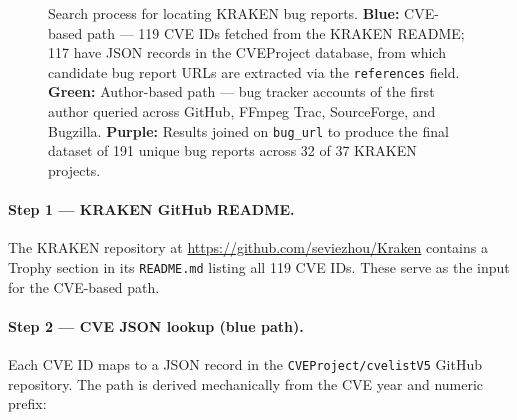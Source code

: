 \documentclass[11pt,a4paper]{article}
\begin{document}
\begin{figure}[htbp]
\caption{Search process for locating KRAKEN bug reports.
  \textcolor{blue!55!black}{\textbf{Blue:}} CVE-based path --- 119 CVE IDs fetched from
  the KRAKEN README; 117 have JSON records in the CVEProject database, from which
  candidate bug report URLs are extracted via the \texttt{references} field.
  \textcolor{green!45!black}{\textbf{Green:}} Author-based path --- bug tracker accounts
  of the first author queried across GitHub, FFmpeg Trac, SourceForge, and Bugzilla.
  \textcolor{purple!60!black}{\textbf{Purple:}} Results joined on \texttt{bug\_url} to
  produce the final dataset of 191 unique bug reports across 32 of 37 KRAKEN projects.}
\label{fig:flowchart}
\end{figure}

\paragraph{Step 1 --- KRAKEN GitHub README.}
The KRAKEN repository at \url{https://github.com/seviezhou/Kraken} contains a Trophy
section in its \texttt{README.md} listing all 119 CVE IDs. These serve as the input for
the CVE-based path.

\paragraph{Step 2 --- CVE JSON lookup (blue path).}
Each CVE ID maps to a JSON record in the \texttt{CVEProject/cvelistV5} GitHub repository.
The path is derived mechanically from the CVE year and numeric prefix:
\end{document}
